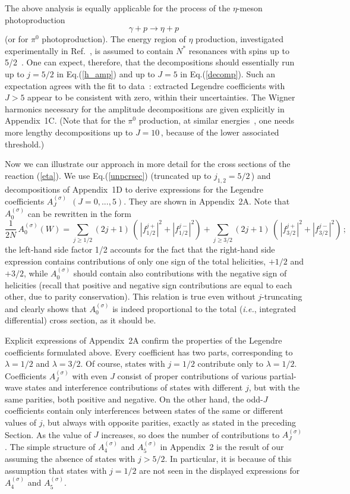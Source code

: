 \documentclass[prc,reprint,onecolumn,amsmath,amssymb,superscriptaddress]{revtex4-1}
\newcommand{\be}{\begin{equation}}
\newcommand{\ee}{\end{equation}}
\begin{document}
The above analysis is equally applicable for the process of the $\eta$-meson 
photoproduction
\be
	\gamma+p \to \eta+p\,
	\label{eta}
\ee
(or for $\pi^0$ photoproduction). The energy region of $\eta$ 
production, investigated experimentally in Ref.~\cite{CBC}, is assumed to contain $N^\ast$ 
resonances with spins up to 5/2~\cite{PDG}. One can expect, therefore, that 
the decompositions should essentially run up to $j=5/2$ in Eq.(\ref{h_amp}) 
and up to $J=5$ in Eq.(\ref{decomp}). Such an 
expectation agrees with the fit to 
data~\cite{CBC}: extracted Legendre coefficients with $J>5$ appear to be 
consistent with zero, within their uncertainties. The Wigner harmonics 
necessary for the amplitude decompositions are given explicitly in 
Appendix~1C.  (Note that for the $\pi^0$ production, at 
similar energies~\cite{A2,CLAS}, one needs more lengthy decompositions up 
to $J=10\,$, because of the lower associated threshold.)

Now we can illustrate our approach in more detail for the cross sections of 
the reaction (\ref{eta}). We use Eq.(\ref{unpcrsec}) (truncated up to 
$j_{1,2}= 5/2\,$) and decompositions of Appendix~1D to derive 
expressions for the Legendre coefficients $A^{(\sigma)}_J~~(J=0,...,5)$. 
They are shown in Appendix~2A. Note that $A^{(\sigma)}_0$ can be 
rewritten in the form
\be
	\frac1{2N}\,A^{(\sigma)}_0(W)=\sum_{j\geq 1/2}(2j+1)\,\left(\,|f_{1/2}^{j+}|^2+
	|f_{1/2}^{j-}|^2\right)+\sum_{j\geq 3/2}(2j+1)\,\left(\,|f_{3/2}^{j+}|^2+
	|f_{3/2}^{j-}|^2\right)\,;
	\label{a0}
\ee
the left-hand side factor 1/2 accounts for the fact that the right-hand side 
expression contains contributions of only one sign of the total helicities, 
$+1/2$ and $+3/2$, while $A^{(\sigma)}_0$ should contain also contributions 
with the negative sign of helicities (recall that positive and negative sign 
contributions are equal to each other, due to parity conservation). This 
relation is true even without \mbox{$j$-truncating} and clearly shows that 
$A^{(\sigma)}_0$ is indeed proportional to the total (\textit{i.e.}, 
integrated differential) cross section, as it should be.

Explicit expressions of Appendix~2A confirm the properties of the Legendre 
coefficients formulated above. Every coefficient has two parts, corresponding 
to $\lambda=1/2$ and $\lambda=3/2$. Of course, states with $j=1/2$ contribute 
only to $\lambda=1/2$. Coefficients $A^{(\sigma)}_J$ with even $J$ consist of 
proper contributions of various partial-wave states and interference 
contributions of states with different $j$, but with the same parities, both 
positive and negative. On the other hand, the odd-$J$ coefficients contain 
only interferences between states of the same or different values of $j$, but 
always with opposite parities, exactly as stated in the preceding Section. 
As the value of $J$ increases, so does the number of contributions to 
$A^{(\sigma)}_J$. The simple structure of $A^{(\sigma)}_4$ and 
$A^{(\sigma)}_5$ in Appendix~2 is the result of our assuming the absence of 
states with $j>5/2$. In particular, it is because of this assumption that 
states with $j=1/2$ are not seen in the displayed expressions for $A^{(\sigma)}_4$ 
and $A^{(\sigma)}_5$.
\end{document}
